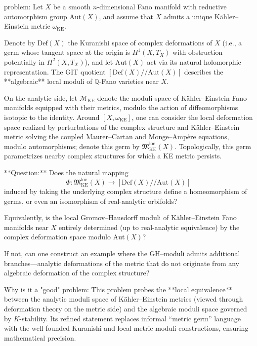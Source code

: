 problem:  
Let \( X \) be a smooth \(n\)-dimensional Fano manifold with reductive automorphism group \(\mathrm{Aut}(X)\), and assume that \(X\) admits a unique Kähler–Einstein metric \( \omega_{\mathrm{KE}} \).  

Denote by \( \mathrm{Def}(X) \) the Kuranishi space of complex deformations of \(X\) (i.e., a germ whose tangent space at the origin is \(H^{1}(X, T_X)\) with obstruction potentially in \(H^{2}(X, T_X)\)), and let \( \mathrm{Aut}(X) \) act via its natural holomorphic representation. The GIT quotient \( [\mathrm{Def}(X)//\mathrm{Aut}(X)] \) describes the **algebraic** local moduli of \( \mathbb{Q}\)-Fano varieties near \( X \).  

On the analytic side, let \( \mathcal{M}_{\mathrm{KE}} \) denote the moduli space of Kähler–Einstein Fano manifolds equipped with their metrics, modulo the action of diffeomorphisms isotopic to the identity.  Around \([X,\omega_{\mathrm{KE}}]\), one can consider the local deformation space realized by perturbations of the complex structure and Kähler–Einstein metric solving the coupled Maurer–Cartan and Monge–Ampère equations, modulo automorphisms; denote this germ by \( \mathfrak{M}^{\mathrm{loc}}_{\mathrm{KE}}(X) \).  Topologically, this germ parametrizes nearby complex structures for which a KE metric persists.

**Question:**  
Does the natural mapping  
\[
\Phi: \mathfrak{M}^{\mathrm{loc}}_{\mathrm{KE}}(X) \longrightarrow [\mathrm{Def}(X)//\mathrm{Aut}(X)]
\]
induced by taking the underlying complex structure define a homeomorphism of germs, or even an isomorphism of real-analytic orbifolds?  

Equivalently, is the local Gromov–Hausdorff moduli of Kähler–Einstein Fano manifolds near \(X\) entirely determined (up to real-analytic equivalence) by the complex deformation space modulo \(\mathrm{Aut}(X)\)?  

If not, can one construct an example where the GH–moduli admits additional branches—analytic deformations of the metric that do not originate from any algebraic deformation of the complex structure?

Why is it a "good" problem:  
This problem probes the **local equivalence** between the analytic moduli space of Kähler–Einstein metrics (viewed through deformation theory on the metric side) and the algebraic moduli space governed by \(K\)-stability. Its refined statement replaces informal “metric germ” language with the well-founded Kuranishi and local metric moduli constructions, ensuring mathematical precision.  

